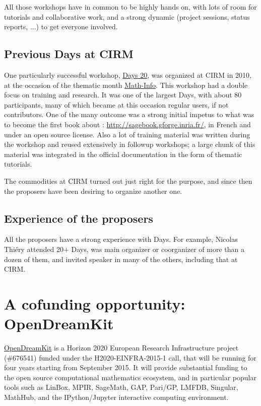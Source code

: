 \documentclass[12pt]{amsbook}
\begin{document}
All those workshops have in common to be highly hands on, with lots of
room for tutorials and collaborative work, and a strong dynamic
(project sessions, status reports, ...) to get everyone involved.

\subsection{Previous \Sage Days at CIRM}

One particularly successful workshop,
\href{https://www.lirmm.fr/arith/wiki/MathInfo2010/SageDays}{\Sage
  Days 20}, was organized at CIRM in 2010, at the occasion of the
thematic month
\href{https://www.lirmm.fr/arith/wiki/MathInfo2010/}{Math-Info}. This
workshop had a double focus on training and research. It was one of
the largest \Sage Days, with about 80 participants, many of which
became at this occasion regular \Sage users, if not contributors. One
of the many outcome was a strong initial impetus to what was to become
the first book about \Sage: \href{Calcul Mathématique avec
  Sage}{http://sagebook.gforge.inria.fr/}, in French and under an open
source license. Also a lot of training material was written during the
workshop and reused extensively in followup workshops; a large chunk
of this material was integrated in the \Sage official documentation in
the form of thematic tutorials.

The commodities at CIRM turned out just right for the purpose, and
since then the proposers have been desiring to organize another one.

\subsection{Experience of the proposers}

All the proposers have a strong experience with \Sage Days. For
example, Nicolas Thiéry attended 20+ \Sage Days, was main organizer or
coorganizer of more than a dozen of them, and invited speaker in many
of the others, including that at CIRM.

\section{A cofunding opportunity: OpenDreamKit}

\href{http://opendreamkit.org}{OpenDreamKit} is a Horizon 2020
European Research Infrastructure project (\#676541) funded under the
H2020-EINFRA-2015-1 call, that will be running for four years starting
from September 2015. It will provide substantial funding to the open
source computational mathematics ecosystem, and in particular popular
tools such as LinBox, MPIR, SageMath, GAP, Pari/GP, LMFDB, Singular,
MathHub, and the IPython/Jupyter interactive computing environment.
\end{document}
